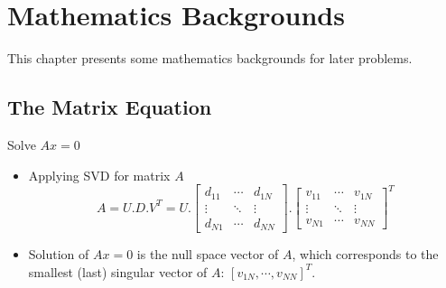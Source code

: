 \chapter{Mathematics Backgrounds}
\label{cha:math-cv}
This chapter presents some mathematics backgrounds for later problems.

\section{The Matrix Equation}
 Solve $Ax=0$
\begin{itemize}
	\item Applying \ac{SVD} for matrix $A$
	\[ A = U.D.V^T = U. \begin{bmatrix}
		d_{11} & \cdots & d_{1N}\\
		\vdots & \ddots & \vdots\\
		d_{N1} & \cdots & d_{NN}
	\end{bmatrix} . \begin{bmatrix}
		v_{11} & \cdots & v_{1N}\\
		\vdots & \ddots & \vdots\\
		v_{N1} & \cdots & v_{NN}
	\end{bmatrix}^T	\]
	\item Solution of $Ax=0$ is the null space vector of $A$, which corresponds to the smallest (last) singular vector of $A$: $ \left[ v_{1N}, \cdots, v_{NN} \right]^T$.
\end{itemize}